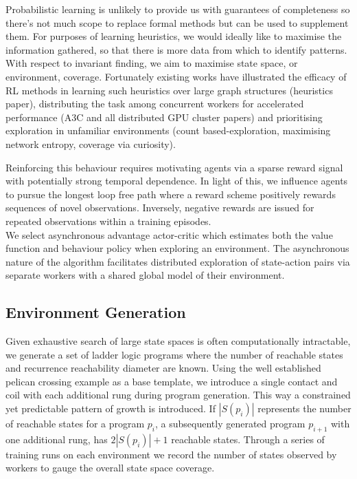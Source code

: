 \documentclass[runningheads]{llncs}
\begin{document}
Probabilistic learning is unlikely to provide us with guarantees of completeness so there's not much scope to replace formal methods but can be used to supplement them. For purposes of learning heuristics, we would ideally like to maximise the information gathered, so that there is more data from which to identify patterns. With respect to invariant finding, we aim to maximise state space, or environment, coverage. Fortunately existing works have illustrated the efficacy of RL methods in learning such heuristics over large graph structures (heuristics paper), distributing the task among concurrent workers for accelerated performance (A3C and all distributed GPU cluster papers) and prioritising exploration in unfamiliar environments (count based-exploration, maximising network entropy, coverage via curiosity).

Reinforcing this behaviour requires motivating  agents via a sparse reward signal with potentially strong temporal dependence. In light of this, we influence agents to pursue the longest loop free path where a reward scheme positively rewards sequences of novel observations. Inversely, negative rewards are issued for repeated observations within a training episodes. \\

We select asynchronous advantage actor-critic \cite{mnih2016asynchronous} which estimates both the value function and behaviour policy when exploring an environment. The asynchronous nature of the algorithm facilitates distributed exploration of state-action pairs via separate workers with a shared global model of their environment.

\subsection{Environment Generation}
Given exhaustive search of large state spaces is often computationally intractable, we generate a set of ladder logic programs where the number of reachable states and recurrence reachability diameter are known. Using the well established pelican crossing example as a base template, we introduce a single contact and coil with each additional rung during program generation. This way a constrained yet predictable pattern of growth is introduced. If $|S(p_i)|$ represents the number of reachable states for a program $p_i$, a subsequently generated program $p_{i+1}$ with one additional rung, has $2|S(p_i)|+1$ reachable states. Through a series of training runs on each environment we record the number of states observed by workers to gauge the overall state space coverage. 
\end{document}
